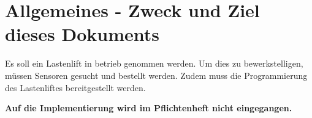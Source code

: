 \section{Allgemeines - Zweck und Ziel dieses Dokuments}

Es soll ein Lastenlift in betrieb genommen werden. Um dies zu bewerkstelligen, müssen Sensoren gesucht und bestellt werden. Zudem muss die Programmierung des Lastenliftes bereitgestellt werden.

\textbf{Auf die Implementierung wird im Pflichtenheft nicht eingegangen.}